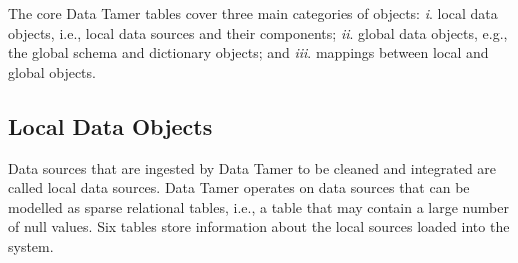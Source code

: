 The core Data Tamer tables cover three main categories of objects: \textit{i}. local data objects, i.e., local data sources and their components; \textit{ii}. global data objects, e.g., the global schema and dictionary objects; and \textit{iii}. mappings between local and global objects.


\subsection{Local Data Objects}

Data sources that are ingested by Data Tamer to be cleaned and integrated are called local data sources.  Data Tamer operates on data sources that can be modelled as sparse relational tables, i.e., a table that may contain a large number of null values.  Six tables store information about the local sources loaded into the system.

